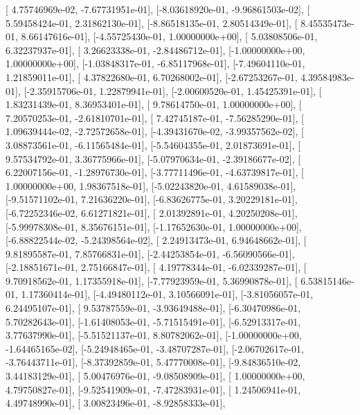 \documentclass{article}
\begin{document}
       [ 4.75746969e-02, -7.67731951e-01],
       [-8.03618920e-01, -9.96861503e-02],
       [ 5.59458424e-01,  2.31862130e-01],
       [-8.86518135e-01,  2.80514349e-01],
       [ 8.45535473e-01,  8.66147616e-01],
       [-4.55725430e-01,  1.00000000e+00],
       [ 5.03808506e-01,  6.32237937e-01],
       [ 3.26623338e-01, -2.84486712e-01],
       [-1.00000000e+00,  1.00000000e+00],
       [-1.03848317e-01, -6.85117968e-01],
       [-7.49604110e-01,  1.21859011e-01],
       [ 4.37822680e-01,  6.70268002e-01],
       [-2.67253267e-01,  4.39584983e-01],
       [-2.35915706e-01,  1.22879941e-01],
       [-2.00600520e-01,  1.45425391e-01],
       [ 1.83231439e-01,  8.36953401e-01],
       [ 9.78614750e-01,  1.00000000e+00],
       [ 7.20570253e-01, -2.61810701e-01],
       [ 7.42745187e-01, -7.56285290e-01],
       [ 1.09639444e-02, -2.72572658e-01],
       [-4.39431670e-02, -3.99357562e-02],
       [ 3.08873561e-01, -6.11565484e-01],
       [-5.54604355e-01,  2.01873691e-01],
       [ 9.57534792e-01,  3.36775966e-01],
       [-5.07970634e-01, -2.39186677e-02],
       [ 6.22007156e-01, -1.28976730e-01],
       [-3.77711496e-01, -4.63739817e-01],
       [ 1.00000000e+00,  1.98367518e-01],
       [-5.02243820e-01,  4.61589038e-01],
       [-9.51571102e-01,  7.21636220e-01],
       [-6.83626775e-01,  3.20229181e-01],
       [-6.72252346e-02,  6.61271821e-01],
       [ 2.01392891e-01,  4.20250208e-01],
       [-5.99978308e-01,  8.35676151e-01],
       [-1.17652630e-01,  1.00000000e+00],
       [-6.88822544e-02, -5.24398564e-02],
       [ 2.24913473e-01,  6.94648662e-01],
       [ 9.81895587e-01,  7.85766831e-01],
       [-2.44253854e-01, -6.56090566e-01],
       [-2.18851671e-01,  2.75166847e-01],
       [ 4.19778344e-01, -6.02339287e-01],
       [ 9.70918562e-01,  1.17355918e-01],
       [-7.77923959e-01,  5.36990878e-01],
       [ 6.53815146e-01,  1.17360414e-01],
       [-4.49480112e-01,  3.10566091e-01],
       [-3.81056057e-01,  6.24495107e-01],
       [ 9.53787559e-01, -3.93649488e-01],
       [-6.30470986e-01,  5.70282643e-01],
       [-1.61408053e-01, -5.71515491e-01],
       [-6.52913317e-01,  3.77637990e-01],
       [-5.51521137e-01,  8.80782062e-01],
       [-1.00000000e+00, -1.64465165e-02],
       [-5.24948465e-01, -3.48707287e-01],
       [-2.06702617e-01, -3.76443711e-01],
       [-8.37392859e-01,  5.47770008e-01],
       [-9.84836510e-02,  3.44183129e-01],
       [ 5.00476976e-01, -9.08508909e-01],
       [ 1.00000000e+00,  4.79750827e-01],
       [-9.52541909e-01, -7.47283931e-01],
       [ 1.24506941e-01,  4.49748990e-01],
       [ 3.00823496e-01, -8.92858333e-01],
\end{document}
